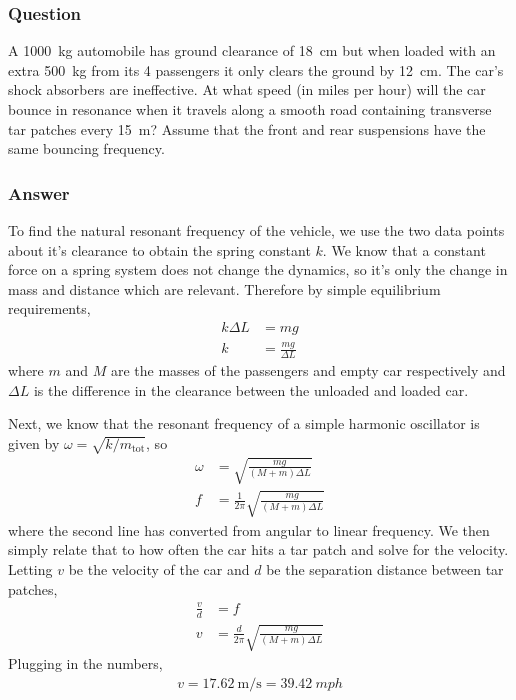 \subsubsection{Question}

A \SI{1000}{\kg} automobile has ground clearance of \SI{18}{\cm} but when
loaded with an extra \SI{500}{\kg} from its 4 passengers it only clears the
ground by \SI{12}{\cm}. The car's shock absorbers are ineffective. At what
speed (in miles per hour) will the car bounce in resonance when it travels
along a smooth road containing transverse tar patches every \SI{15}{\m}?
Assume that the front and rear suspensions have the same bouncing frequency.

\subsubsection{Answer}

To find the natural resonant frequency of the vehicle, we use the two data
points about it's clearance to obtain the spring constant $k$. We know that
a constant force on a spring system does not change the dynamics, so it's
only the change in mass and distance which are relevant. Therefore by simple
equilibrium requirements,
\begin{align*}
    k \Delta L &= mg \\
    k &= \frac{mg}{\Delta L}
\end{align*}
where $m$ and $M$ are the masses of the passengers and empty car respectively
and $\Delta L$ is the difference in the clearance between the unloaded and loaded
car.

Next, we know that the resonant frequency of a simple harmonic oscillator is
given by ${\omega}  = \sqrt{k/m_\mathrm{tot}}$, so
\begin{align*}
    {\omega}  &= \sqrt{\frac{mg}{(M+m)\Delta L}} \\
    f &= \frac{1}{2{\pi} } \sqrt{\frac{mg}{(M+m)\Delta L}}
\end{align*}
where the second line has converted from angular to linear frequency. We then
simply relate that to how often the car hits a tar patch and solve for the
velocity. Letting $v$ be the velocity of the car and $d$ be the separation
distance between tar patches,
\begin{align*}
    \frac{v}{d} &= f \\
    v &= \frac{d}{2{\pi} } \sqrt{\frac{mg}{(M+m)\Delta L}}
\end{align*}
Plugging in the numbers,
\begin{align}
    \boxed{
    v = \SI{17.62}{\m\per\s} = \SI{39.42}{mph}
    }
\end{align}

